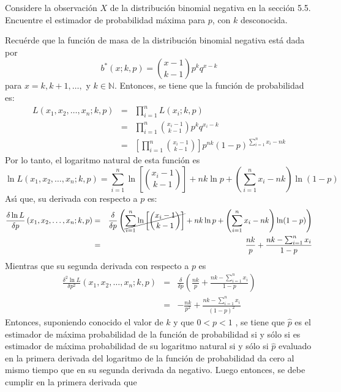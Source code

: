 \begin{enunciado}
 Considere la observaci\'on $X$ de la distribuci\'on binomial negativa en la secci\'on 5.5. Encuentre el estimador de probabilidad m\'axima para $p$, con $k$ desconocida.
\end{enunciado}

\begin{solucion}
 Recu\'erde que la funci\'on de masa de la distribuci\'on binomial negativa est\'a dada por
 \begin{equation*}
  b^{*}(x;k,p) = \binom{x-1}{k-1} p^kq^{x-k}
 \end{equation*}
 para $x = k, k +1, \ldots,$ y $k \in \mathbb{N}$.
 Entonces, se tiene que la funci\'on de probabilidad es:
 \begin{eqnarray*}
  L\left( x_1, x_2, \ldots, x_n; k, p \right) & = & \prod_{i=1}^n L\left( x_i; k, p \right) \\
  & = & \prod_{i=1}^n \binom{x_i-1}{k-1} p^kq^{x_i-k} \\
  & = & \left[ \prod_{i=1}^n \binom{x_i - 1}{k - 1} \right] p^{nk} (1 - p)^{\sum_{i=1}^n x_i - nk}
 \end{eqnarray*}
 Por lo tanto, el logaritmo natural de esta funci\'on es
 \begin{equation*}
  \ln L \left( x_1, x_2, \ldots, x_n; k, p \right) = \sum_{i=1}^n \ln\left[ \binom{x_i-1}{k-1} \right] + nk\ln p + \left( \sum_{i=1}^n x_i - nk \right)\ln(1-p)
 \end{equation*}
 As\'{\i} que, su derivada con respecto a $p$ es:
 \begin{eqnarray*}
  \frac{\delta \ln L}{\delta p} \left( x_1, x_2, \ldots, x_n; k, p \right) & = & \frac{\delta}{\delta p} \left( \cancel{ \sum_{i=1}^n \ln\left[ \binom{x_i-1}{k-1} \right] } + nk\ln p + \left( \sum_{i=1}^n x_i - nk \right)\ln(1-p) \right) \\
  & = & \frac{nk}{p} + \frac{nk - \sum_{i=1}^n x_i}{1-p}
 \end{eqnarray*}
 Mientras que su segunda derivada con respecto a $p$ es
 \begin{eqnarray*}
  \frac{\delta^2 \ln L}{\delta p^2} \left( x_1, x_2, \ldots, x_n; k, p \right) & = & \frac{\delta}{\delta p} \left( \frac{nk}{p} + \frac{nk - \sum_{i=1}^n x_i}{1-p} \right) \\
  & = & - \frac{nk}{p^2} + \frac{nk - \sum_{i=1}^n x_i}{(1-p)^2}
 \end{eqnarray*}
 Entonces, suponiendo conocido el valor de $k$ y que $0< p < 1$ , se tiene que $\hat{p}$ es el estimador de m\'axima probabilidad de la funci\'on de probabilidad si y s\'olo si es estimador de m\'axima probabilidad de su logaritmo natural si y s\'olo si $\hat{p}$ evaluado en la primera derivada del logaritmo de la funci\'on de probabilidad da cero al mismo tiempo que en su segunda derivada da negativo. Luego entonces, se debe cumplir en la primera derivada que

\end{solucion}
